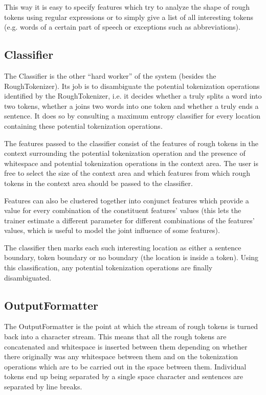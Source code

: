 This way it is easy to specify features which try to analyze the shape
of rough tokens using regular expressions or to simply give a list of
all interesting tokens (e.g. words of a certain part of speech or
exceptions such as abbreviations).

\subsection{Classifier}

The Classifier is the other ``hard worker'' of the system (besides the
RoughTokenizer). Its job is to disambiguate the potential tokenization
operations identified by the RoughTokenizer, i.e. it decides whether a
\maysplit{} truly splits a word into two tokens, whether a \mayjoin{}
joins two words into one token and whether a \maybreaksentence{} truly
ends a sentence. It does so by consulting a maximum entropy classifier
for every location containing these potential tokenization operations.

The features passed to the classifier consist of the features of rough
tokens in the context surrounding the potential tokenization operation
and the presence of whitespace and potential tokenization operations
in the context area. The user is free to select the size of the
context area and which features from which rough tokens in the context
area should be passed to the classifier.

Features can also be clustered together into conjunct features which
provide a value for every combination of the constituent features'
values (this lets the trainer estimate a different parameter for
different combinations of the features' values, which is useful to
model the joint influence of some features).

The classifier then marks each such interesting location as either a
sentence boundary, token boundary or no boundary (the location is
inside a token). Using this classification, any potential tokenization
operations are finally disambiguated.

\subsection{OutputFormatter}

The OutputFormatter is the point at which the stream of rough tokens
is turned back into a character stream. This means that all the rough
tokens are concatenated and whitespace is inserted between them
depending on whether there originally was any whitespace between them
and on the tokenization operations which are to be carried out in the
space between them. Individual tokens end up being separated by a
single space character and sentences are separated by line breaks.
